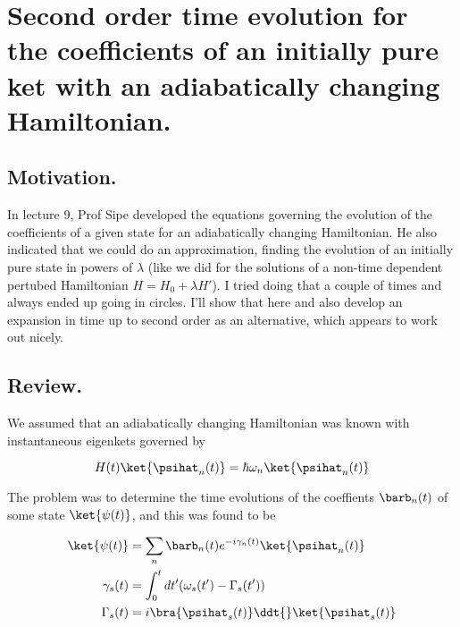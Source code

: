 
%

\chapter{Second order time evolution for the coefficients of an initially pure ket with an adiabatically changing Hamiltonian.}
\label{chap:adiabaticApprox}
{}
\date{Nov 11, 2011}

\beginArtWithToc

\section{Motivation.}

In lecture 9, Prof Sipe developed the equations governing the evolution of the coefficients of a given state for an adiabatically changing Hamiltonian.  He also indicated that we could do an approximation, finding the evolution of an initially pure state in powers of $\lambda$ (like we did for the solutions of a non-time dependent pertubed Hamiltonian $H = H_0 + \lambda H'$).  I tried doing that a couple of times and always ended up going in circles.  I'll show that here and also develop an expansion in time up to second order as an alternative, which appears to work out nicely.

\section{Review.}

We assumed that an adiabatically changing Hamiltonian was known with instantaneous eigenkets governed by

\begin{equation}\label{eqn:adiabaticApprox:10}
H(t) \ket{\psihat_n(t)} = \hbar \omega_n \ket{\psihat_n(t)} 
\end{equation}

The problem was to determine the time evolutions of the coeffients $\barb_n(t)$ of some state $\ket{\psi(t)}$, and this was found to be

\begin{align}\label{eqn:adiabaticApprox:30}
\ket{\psi(t)} &= \sum_n \barb_n(t) e^{-i \gamma_n(t)} \ket{\psihat_n(t)} \\
\gamma_s(t) &= \int_0^t dt' (\omega_s(t') - \Gamma_s(t')) \\
\Gamma_s(t) &= i \bra{\psihat_s(t)} \ddt{} \ket{\psihat_s(t)} 
\end{align}

